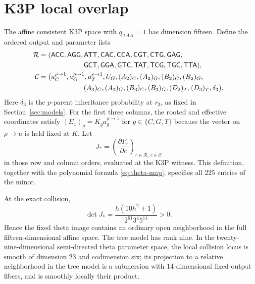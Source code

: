 \documentclass[11pt]{article}
\theoremstyle{remark}\newtheorem{remark}[theorem]{Remark}
\begin{document}
\section{K3P local overlap}\label{sec:k3p-rank}
The affine consistent K3P space with $q_{AAA}=1$ has dimension fifteen.
Define the ordered output and parameter lists
\begin{align*}
\mathcal R={}&(\mathsf{ACC},\mathsf{AGG},\mathsf{ATT},\mathsf{CAC},\mathsf{CCA},\mathsf{CGT},\mathsf{CTG},\mathsf{GAG},\\
&\hspace{18mm}\mathsf{GCT},\mathsf{GGA},\mathsf{GTC},\mathsf{TAT},\mathsf{TCG},\mathsf{TGC},\mathsf{TTA}),\\
\mathcal C={}&\bigl(a_C^{\rho\to1},a_G^{\rho\to1},a_T^{\rho\to1},U_G,
(A_2)_C,(A_2)_G,(B_2)_C,(B_2)_G,\\
&\hspace{18mm}(A_3)_C,(A_3)_G,(B_3)_C,(B_3)_G,(D_2)_T,(D_3)_T,\delta_3\bigr).
\end{align*}
Here $\delta_3$ is the $p$-parent inheritance probability at $r_3$, as fixed in Section~\ref{sec:models}. For the first three columns, the rooted and effective coordinates satisfy $(E_1)_g=K_g a_g^{\rho\to1}$ for $g\in\{C,G,T\}$ because the vector on $\rho\to u$ is held fixed at $K$. Let
\begin{equation}\label{eq:Jstar-definition}
J_*=\left(\frac{\partial F_r}{\partial c}\right)_{r\in\mathcal R,\,c\in\mathcal C}
\end{equation}
in those row and column orders, evaluated at the K3P witness. This definition, together with the polynomial formula \eqref{eq:theta-map}, specifies all $225$ entries of the minor.
\begin{proposition}\label{prop:k3p-rank}
At the exact collision,
\begin{equation}\label{eq:k3p-det}\boxed{\det J_*=\frac{h(10h^2+1)}{2^{61}3^4 5^{14}}>0.}\end{equation}
Hence the fixed theta image contains an ordinary open neighborhood in the full fifteen-dimensional affine space. The tree model has rank nine. In the twenty-nine-dimensional semi-directed theta parameter space, the local collision locus is smooth of dimension $23$ and codimension six; its projection to a relative neighborhood in the tree model is a submersion with $14$-dimensional fixed-output fibers, and is smoothly locally their product.
\end{proposition}
\end{document}
